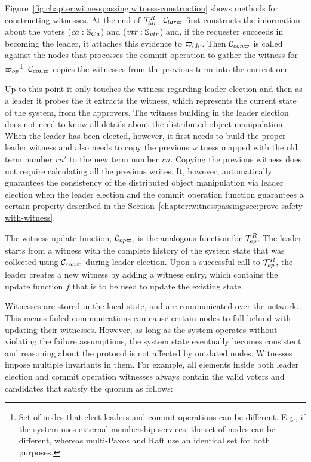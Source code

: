 Figure~\ref{fig:chapter:witnesspassing:witness-construction} shows methods for constructing witnesses.
At the end of $\mathcal{T}^{R}_{ldr}$, $\mathcal{C}_{ldr\varpi}$ first constructs the information about the
voters ($ca:\mathbb{S}_{Ca}$) and ($vtr:\mathbb{S}_{vtr}$) and, if the requester succeeds in becoming the leader,
it attaches this evidence to ${\varpi_{ldr}}$. Then $\mathcal{C}_{con\varpi}$ is called against
the nodes that processes the commit operation to gather the witness for
${\varpi_{op}}$\footnote{Set of nodes that elect leaders and commit operations
can be different. E.g., if the system uses external membership services,
the set of nodes can be different, whereas multi-Paxos and Raft use an identical
set for both purposes.}.
$\mathcal{C}_{con\varpi}$ copies the witnesses from the previous term into the current one.

Up to this point it only
touches the witness regarding leader election and then as a leader it probes the 
it extracts the witness, which represents the current state of the system, from 
the approvers.
The witness building in the leader election does not need to know 
all details about the distributed object manipulation.
When the leader has been elected, however, it first needs to build the proper leader witness and 
also needs to copy the previous witness mapped with the old term number $rn'$ to
 the new term number $rn$. 
 Copying the previous witness does not require calculating all the previous writes. 
 It, however, automatically guarantees the consistency of the distributed object manipulation 
 via leader election when the leader election and the commit operation function guarantees a 
 certain property described in the Section~\ref{chapter:witnesspassing:sec:prove-safety-with-witness}. 

The witness update function, $\mathcal{C}_{op\varpi}$, is the analogous function for $\mathcal{T}^{R}_{op}$.
The leader starts from a witness with the complete history of the system state
that was collected using $\mathcal{C}_{con\varpi}$ during leader election.
Upon a successful call to $\mathcal{T}^{R}_{op}$, the leader creates a new witness by
adding a witness entry, which contains the update function $f$ that is to be used
to update the existing state.

Witnesses are stored in the local state, and are communicated over the network.
This means failed communications can
cause certain nodes to fall behind with updating their witnesses.
However, as long as the system operates without violating the failure 
assumptions, the system state eventually becomes consistent and reasoning 
about the protocol is not affected by outdated nodes.
Witnesses impose multiple invariants in them.
For example, all elements inside both leader election and commit operation witnesses 
always contain the valid voters and candidates that satisfy the quorum as follows:

